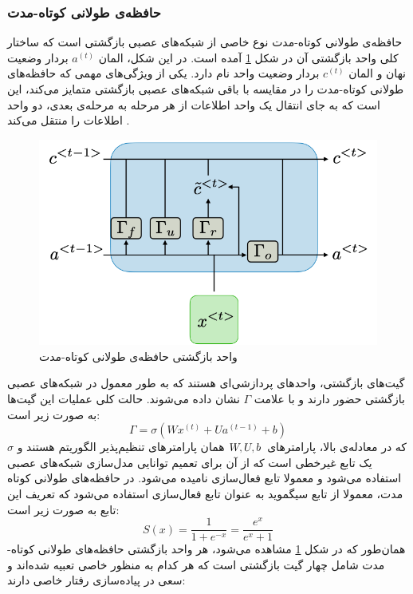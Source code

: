 \subsubsection{حافظه‌ی طولانی کوتاه-مدت}
حافظه‌ی طولانی کوتاه-مدت نوع خاصی از شبکه‌های عصبی بازگشتی است که ساختار کلی واحد بازگشتی آن در شکل
\ref{fig:lstmblock}
آمده است.
در این شکل، المان
$a^{(t)}$
بردار وضعیت نهان و المان
$c^{(t)}$
بردار وضعیت واحد نام دارد.
یکی از ویژگی‌های مهمی که حافظه‌های طولانی کوتاه-مدت را در مقایسه با باقی شبکه‌های عصبی بازگشتی متمایز می‌کند، این است که به جای انتقال یک واحد اطلاعات از هر مرحله به مرحله‌ی بعدی، دو واحد اطلاعات را منتقل می‌کند
\cite{lstm_paper}
.

\begin{figure}
	\centering
	\includegraphics[scale=0.4]{figures/lstm-rec-unit.png}
	\caption [
	واحد بازگشتی حافظه‌ی طولانی کوتاه-مدت
	]{
	واحد بازگشتی حافظه‌ی طولانی کوتاه-مدت 
	\cite{rnncheat}
	}
	\label{fig:lstmblock}
\end{figure}

گیت‌های بازگشتی، واحدهای پردازشی‌ای هستند که به طور معمول در شبکه‌های عصبی بازگشتی حضور دارند و با علامت 
$\Gamma$
نشان داده می‌شوند. حالت کلی عملیات این گیت‌ها به صورت زیر است:
\begin{equation} \label{eqn:lstm_gate}
    \Gamma = \sigma(Wx^{(t)} + Ua^{(t-1)} + b)
\end{equation}
\hsm
که در معادله‌ی بالا، پارامترهای
$W, U, b \hspace{0.5mm}$
همان پارامترهای تنظیم‌پذیر الگوریتم هستند و
$\sigma$
یک تابع غیرخطی است که از آن برای تعمیم توانایی مدل‌سازی شبکه‌های عصبی استفاده می‌شود و معمولا تابع فعال‌سازی نامیده می‌شود.
در حافظه‌های طولانی کوتاه مدت، معمولا از تابع سیگموید به عنوان تابع فعال‌سازی استفاده می‌شود که تعریف این تابع به صورت زیر است:
\begin{equation}
    S(x) = \frac{1}{1+e^{-x}} = \frac{e^x}{e^x + 1}
\end{equation}
\vspace{-2mm}
همان‌طور که در شکل
\ref{fig:lstmblock}
مشاهده می‌شود، هر واحد بازگشتی حافظه‌های طولانی کوتاه-مدت شامل چهار گیت بازگشتی است که هر کدام به منظور خاصی تعبیه شده‌اند و سعی در پیاده‌سازی رفتار خاصی دارند:

